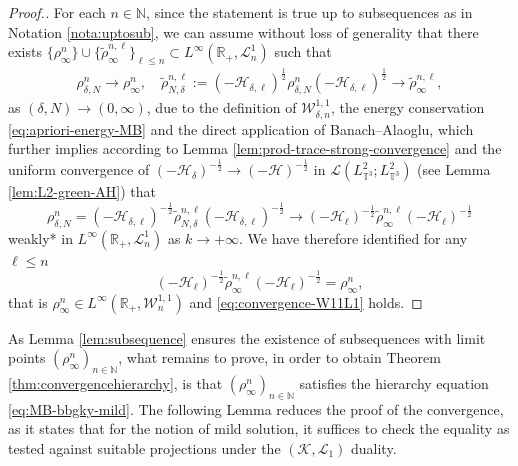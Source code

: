\begin{proof}[Proof.]For each $n \in \mathbb{N}$, since the statement is true up to subsequences as in Notation \ref{nota:uptosub}, we can assume without loss of generality that there exists $\{\rho^n_{\infty}\} \cup \{ \tilde{\rho}^{n,\ell}_{\infty}\}_{\ell \leq n} \subset L^{\infty} (\mathbb{R}_+, \mathcal{L}^1_n)$ such that
\begin{align*}
\rho^n_{\delta,N} \rightarrow \rho^n_{\infty},
     \quad  \tilde{\rho}^{n,\ell}_{N,\delta} := (- \mathcal{H}_{\delta, \ell})^{\frac{1}{2}} \rho_{\delta,N}^n (- \mathcal{H}_{\delta,
    \ell})^{\frac{1}{2}} \rightarrow \tilde{\rho}^{n,\ell}_{\infty}, 
\end{align*}
  as $(\delta,N) \rightarrow (0,\infty)$, due to the definition of $\mathcal{W}^{1,1}_{\delta,n}$, the energy conservation \eqref{eq:apriori-energy-MB} and the direct application of Banach--Alaoglu, which further implies according to Lemma
  \ref{lem:prod-trace-strong-convergence} and the uniform convergence of $(-
  \mathcal{H}_{\delta})^{- \frac{1}{2}} \rightarrow (- \mathcal{H})^{- \frac{1}{2}}$ in
  $\mathcal{L} (L_{\mathbb{T}^3}^2 ; L_{\mathbb{T}^3}^2)$ (see Lemma
  \ref{lem:L2-green-AH}) that
  \[ 
  \rho_{\delta,N}^n = (- \mathcal{H}_{\delta, \ell})^{- \frac{1}{2}} \tilde{\rho}^{n,\ell}_{
     N,\delta} (- \mathcal{H}_{\delta, \ell})^{- \frac{1}{2}} \rightarrow (-
     \mathcal{H}_{\ell})^{- \frac{1}{2}} \tilde{\rho}^{n,\ell}_{\infty} (-
     \mathcal{H}_{\ell})^{- \frac{1}{2}}
      \]
  weakly* in $L^{\infty} (\mathbb{R}_+, \mathcal{L}^1_n)$ as $k \rightarrow +
  \infty$. We have therefore identified for any $\ell \leqslant
     n$
  \[ (- \mathcal{H}_{\ell})^{- \frac{1}{2}} \tilde{\rho}^{n,\ell}_{\infty} (-
     \mathcal{H}_{\ell})^{- \frac{1}{2}} = \rho^n_{\infty},
    \]
  that is $\rho^n_{\infty} \in L^{\infty} (\mathbb{R}_+, \mathcal{W}^{1,
  1}_n)$ and \eqref{eq:convergence-W11L1} holds.
\end{proof}

As Lemma \ref{lem:subsequence} ensures the existence of subsequences with limit points $(\rho^n_{\infty})_{n \in
\mathbb{N}}$, what
remains to prove, in order to obtain Theorem
\ref{thm:convergencehierarchy}, is that $(\rho^n_{\infty})_{n \in
\mathbb{N}}$ satisfies the hierarchy equation \eqref{eq:MB-bbgky-mild}. The following Lemma reduces the proof of the convergence, as it states that for the notion of mild solution, it suffices to check the equality as tested against suitable projections under the $(\mathcal{K},\mathcal{L}_1)$ duality. \\


